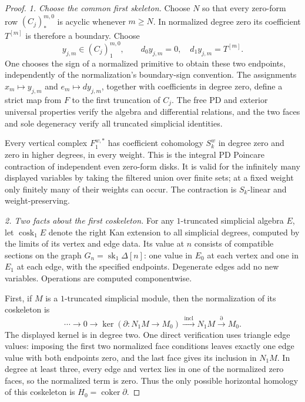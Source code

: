\begin{proof}
\emph{1. Choose the common first skeleton.}
Choose $N$ so that every zero-form row $(C_j)_*^{m,0}$ is
acyclic whenever $m\ge N$. In normalized degree zero its
coefficient $T^{[m]}$ is therefore a boundary. Choose
\[
 y_{j,m}\in (C_j)_1^{m,0},\qquad
       d_0y_{j,m}=0,\quad d_1y_{j,m}=T^{[m]}.
                                                               \tag{136.SK2}
\]
One chooses the sign of a normalized primitive to obtain
these two endpoints, independently of the normalization's
boundary-sign convention. The assignments
$x_m\mapsto y_{j,m}$ and $e_m\mapsto dy_{j,m}$, together with
coefficients in degree zero, define a strict map from $F$
to the first truncation of $C_j$. The free PD and exterior
universal properties verify the algebra and differential
relations, and the two faces and sole degeneracy verify
all truncated simplicial identities.

Every vertical complex $F_1^{w,*}$ has coefficient cohomology
$S_k^w$ in degree zero and zero in higher degrees, in every
weight. This is the integral PD Poincare contraction of
independent even zero-form disks. It is valid for the
infinitely many displayed variables by taking the filtered
union over finite sets; at a fixed weight only finitely many
of their weights can occur. The contraction is $S_k$-linear
and weight-preserving.

\emph{2. Two facts about the first coskeleton.}
For any $1$-truncated simplicial algebra $E$, let
$\operatorname{cosk}_1E$ denote the right Kan extension to
all simplicial degrees, computed by the limits of its
vertex and edge data. Its value at $n$ consists of compatible
sections on the graph $G_n=\operatorname{sk}_1\Delta[n]$:
one value in $E_0$ at each vertex and one in $E_1$ at each
edge, with the specified endpoints. Degenerate edges add
no new variables. Operations are computed componentwise.

First, if $M$ is a $1$-truncated simplicial module, then the
normalization of its coskeleton is
\[
 \cdots\longrightarrow0\longrightarrow
       \ker(\partial:N_1M\to M_0)
       \xrightarrow{\;\mathrm{incl}\;}N_1M
       \xrightarrow{\partial}M_0.
                                                               \tag{136.SK3}
\]
The displayed kernel is in degree two. One direct verification
uses triangle edge values: imposing the first two normalized
face conditions leaves exactly one edge value with both
endpoints zero, and the last face gives its inclusion in
$N_1M$. In degree at least three, every edge and vertex lies
in one of the normalized zero faces, so the normalized term
is zero. Thus the only possible horizontal homology of this
coskeleton is $H_0=\operatorname{coker}\partial$.


\end{proof}

